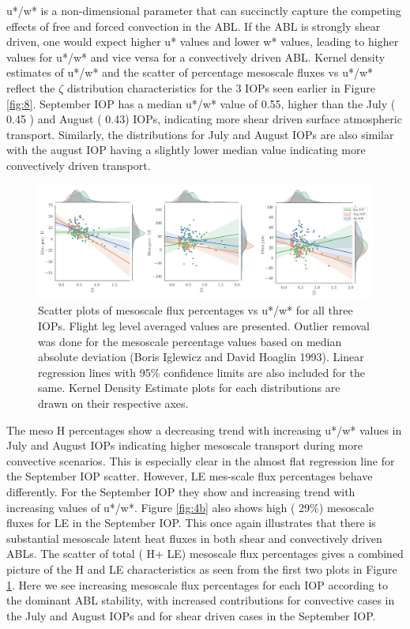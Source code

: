 \documentclass[draft]{agujournal2019}
\begin{document}
u*/w* is a non-dimensional parameter that can succinctly capture the competing effects of free and forced convection in the ABL. If the ABL is strongly shear driven, one would expect higher u* values and lower w* values, leading to higher values for u*/w* and vice versa for a convectively driven ABL. Kernel density estimates of u*/w* and the scatter of percentage mesoscale fluxes vs u*/w* reflect the $\zeta$ distribution characteristics for the 3 IOPs seen earlier in Figure \ref{fig:8}. September IOP has a median u*/w* value of 0.55, higher than the July ( 0.45 ) and August ( 0.43) IOPs, indicating more shear driven surface atmospheric transport. Similarly, the distributions for July and August IOPs are also similar with the august IOP having a slightly lower median value indicating more convectively driven transport.  
 \begin{figure}[hbtp]
 \noindent\includegraphics[width=\textwidth]{scatter_meso.png}
\caption{ Scatter plots of mesoscale flux percentages vs u*/w* for all three IOPs. Flight leg level averaged values are presented. Outlier removal was done for the mesoscale percentage values based on median absolute deviation (Boris Iglewicz and David Hoaglin 1993). Linear regression lines with 95\% confidence limits are also included for the same. Kernel Density Estimate plots for each distributions are drawn on their respective axes.}
\label{fig:scatter_meso}
 \end{figure}
 
The meso H percentages show a decreasing trend with increasing u*/w* values in July and August IOPs indicating higher mesoscale transport during more convective scenarios. This is especially clear in the almost flat regression line for the September IOP scatter. However, LE mes-scale flux percentages behave differently. For the September IOP they show and increasing trend with increasing values of u*/w*. Figure \ref{fig:4b} also shows high ( 29\%) mesoscale fluxes for LE in the September IOP. This once again illustrates that there is substantial mesoscale latent heat fluxes in both shear and convectively driven ABLs. The scatter of total ( H+ LE) mesoscale flux percentages gives a combined picture of the H and LE characteristics as seen from the first two plots in Figure \ref{fig:scatter_meso}. Here we see increasing mesoscale flux percentages for each IOP according to the dominant ABL stability, with increased contributions for convective cases in the July and August IOPs and for shear driven cases in the September IOP.  
\end{document}
